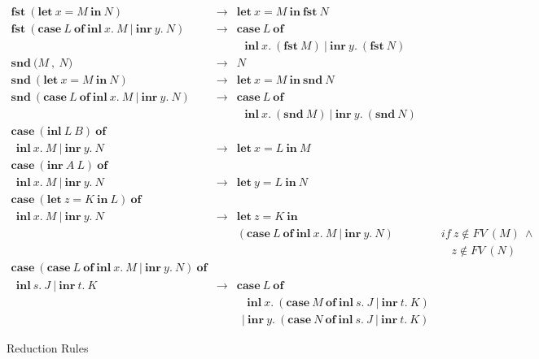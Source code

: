 \documentclass[11p,a4paper]{article}
\newcommand{\expshr}[3]{\mathbf{let}\ #1\boldsymbol{=}#2\ \mathbf{in}\ #3}
\newcommand{\expprd}[2]{\boldsymbol{(}#1\ \boldsymbol{,}\ #2\boldsymbol{)}}
\newcommand{\expfst}[1]{\mathbf{fst}\ #1}
\newcommand{\expsnd}[1]{\mathbf{snd}\ #1}
\newcommand{\explft}[2]{\mathbf{inl}\ #1\ #2}
\newcommand{\exprgt}[2]{\mathbf{inr}\ #1\ #2}
\newcommand{\expcas}[5]{\mathbf{case}\ #1\ \mathbf{of}\ \mathbf{inl}\ #2.\ #3\ \boldsymbol{|}\ \mathbf{inr}\ #4.\ #5}
\newcommand{\fv}[1]{FV\ (#1)}
\newcommand{\valuep}[1]{Value\ (#1)}
\begin{document}
\begin{figure*}[h]
\[\begin{array}{lcll}
\expfst{(\expshr{x}{M}{N})}                   & \longrightarrow 
& \expshr{x}{M}{\expfst{N}}                    & \\

\expfst{(\expcas{L}{x}{M}{y}{N})}          & \longrightarrow 
& \mathbf{case}\ L\ \mathbf{of}\\& & \ \ \ \mathbf{inl}\ x.\ (\expfst{M})\ \boldsymbol{|}\ \mathbf{inr}\ y.\ (\expfst{N}) 
& \\

\expsnd{\expprd{M}{N}}                          & \longrightarrow 
& N                                               & \\

\expsnd{(\expshr{x}{M}{N})}                    & \longrightarrow 
& \expshr{x}{M}{\expsnd{N}}                     & \\

\expsnd{(\expcas{L}{x}{M}{y}{N})}          & \longrightarrow 
& \mathbf{case}\ L\ \mathbf{of}\\& & \ \ \ \mathbf{inl}\ x.\ (\expsnd{M})\ \boldsymbol{|}\ \mathbf{inr}\ y.\ (\expsnd{N}) 
& \\

 
\mathbf{case}\ (\explft{L}{B})\ \mathbf{of}\\\ \  \mathbf{inl}\ x.\ M\ \boldsymbol{|}\ \mathbf{inr}\ y.\ N 
& \longrightarrow 
& \expshr{x}{L}{M}                             & \\
 
\mathbf{case}\ (\exprgt{A}{L})\ \mathbf{of}\\\ \  \mathbf{inl}\ x.\ M\ \boldsymbol{|}\ \mathbf{inr}\ y.\ N 
& \longrightarrow 
& \expshr{y}{L}{N}                             & \\

\mathbf{case}\ (\expshr{z}{K}{L})\ \mathbf{of}\\\ \  \mathbf{inl}\ x.\ M\ \boldsymbol{|}\ \mathbf{inr}\ y.\ N 
& \longrightarrow 
& \expshr{z}{K}{\\&&(\expcas{L}{x}{M}{y}{N})}       & if\ z \notin \fv{M}\ \wedge \\ & & &\ \ \ \ z \notin \fv{N}  \\
 
\mathbf{case}\ (\expcas{L}{x}{M}{y}{N})\ \mathbf{of}\\\ \  \mathbf{inl}\ s.\ J\ \boldsymbol{|}\ \mathbf{inr}\ t.\ K 
& \longrightarrow 
& \mathbf{case}\ L \ \mathbf{of}\\ & &\ \ \ \ \mathbf{inl}\ x.\ (\expcas{M}{s}{J}{t}{K})\ \\ & &\ \ \boldsymbol{|}\ \mathbf{inr}\ y.\ (\expcas{N}{s}{J}{t}{K}) 


\end{array}
\]
\caption{Reduction Rules}
\label{fig:red}
\end{figure*} 
\end{document}
